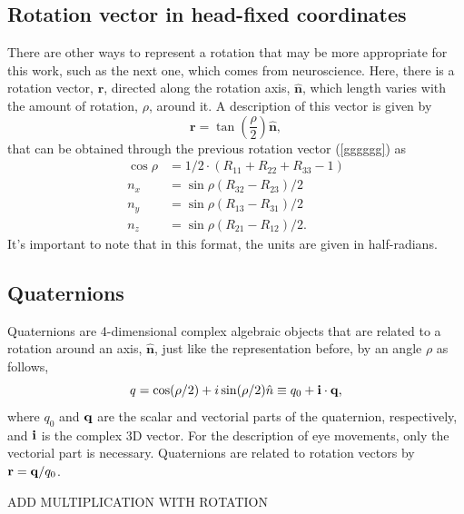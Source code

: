 \subsection{Rotation vector in head-fixed coordinates}
\label{killme}
There are other ways to represent a rotation that may be more appropriate for this work, such as the next one, which comes from neuroscience. Here, there is a rotation vector, $\mathbf{r}$, directed along the rotation axis, $\hat{\mathbf{n}}$, which length varies with the amount of rotation, $\rho$, around it. A description of this vector is given by 
\begin{equation}
\mathbf{r} = \tan (\frac{\rho}{2}) \hat{ \mathbf{n}},
\end{equation}
that can be obtained through the previous rotation vector (\ref{gggggg}) as 
\begin{equation}
\label{sec2:eq:n}
\begin{aligned} 
\cos \rho & = 1 / 2 \cdot \left( R _ { 11 } + R _ { 22 } + R _ { 33 } - 1 \right) \\ 
n_ { x } & = \sin \rho \left( R _ { 32 } - R _ { 23 } \right) / 2  \\ 
n _ { y } & = \sin \rho \left( R _ { 13 } - R _ { 31 } \right) / 2  \\ 
n _ { z } & = \sin \rho \left( R _ { 21 } - R _ { 12 } \right) / 2  .
\end{aligned}
\end{equation}
It's important to note that in this format, the units are given in half-radians.

\subsection{Quaternions}
\label{cha2:represent:quat}
Quaternions are 4-dimensional complex algebraic objects that are related to a rotation around an axis, $\hat{ \mathbf{n}}$, just like the representation before, by an angle $\rho$ as follows,
\begin{equation}
\label{sec2:eq:q}
q = \cos ( \rho / 2 ) + i \sin ( \rho / 2 ) \hat{n} \equiv q _ { 0 } + {\bf i}\cdot  {\bf q},
\end{equation}
where $q_0$ and ${\bf q}$ are the scalar and vectorial parts of the quaternion, respectively, and ${\bf i}$ is the complex 3D vector. For the description of eye movements, only the vectorial part is necessary. Quaternions are related to rotation vectors by $ \mathbf{r}  = {\bf q} / q _ { 0 }$.
\cite{rep}

ADD MULTIPLICATION WITH ROTATION
